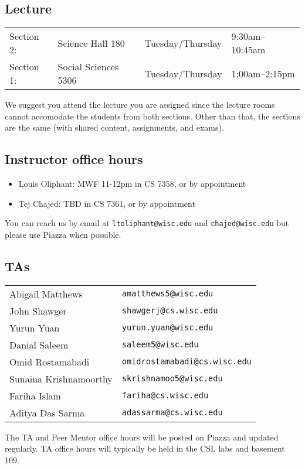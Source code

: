 \subsection*{Lecture}
\begin{tabular}{llll}
  Section 2: & Science Hall 180 & Tuesday/Thursday & 9:30am--10:45am \\
  Section 1: & Social Sciences 5306 & Tuesday/Thursday & 1:00am--2:15pm
\end{tabular}

We suggest you attend the lecture you are assigned since the lecture rooms
cannot accomodate the students from both sections. Other than that, the sections
are the same (with shared content, assignments, and exams).

\subsection*{Instructor office hours}
\begin{itemize}
  \item Louis Oliphant: MWF 11-12pm in CS 7358, or by appointment
  \item Tej Chajed: TBD in CS 7361, or by appointment
\end{itemize}

You can reach us by email at \texttt{ltoliphant@wisc.edu} and
\texttt{chajed@wisc.edu} but please use Piazza when possible.

\subsection*{TAs}
\begin{tabular}{ll}
Abigail Matthews & \texttt{amatthews5@wisc.edu} \\
John Shawger & \texttt{shawgerj@cs.wisc.edu} \\
Yurun Yuan & \texttt{yurun.yuan@wisc.edu} \\
Danial Saleem & \texttt{saleem5@wisc.edu} \\
Omid Rostamabadi & \texttt{omidrostamabadi@cs.wisc.edu} \\
Sunaina Krishnamoorthy & \texttt{skrishnamoo5@wisc.edu} \\
Fariha Islam & \texttt{fariha@cs.wisc.edu} \\
Aditya Das Sarma & \texttt{adassarma@cs.wisc.edu} \\
\end{tabular}

The TA and Peer Mentor office hours will be posted on Piazza and updated
regularly. TA office hours will typically be held in the CSL labs and basement
109.

